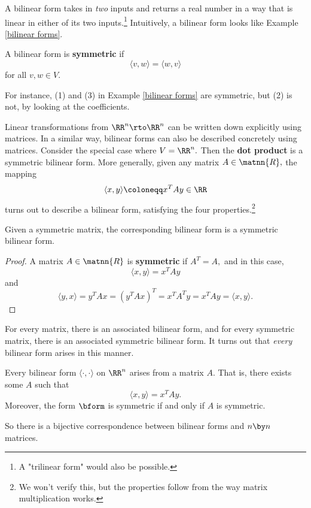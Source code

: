 A bilinear form takes in \emph{two} inputs and returns a real number in a way that is linear in either of its two inputs.\footnote{A "trilinear form" would also be possible.} Intuitively, a bilinear form looks like Example \ref{bilinear forms}.

\begin{definition}
A bilinear form is \textbf{symmetric} if \[\langle v, w \rangle = \langle w, v\rangle\] for all $v, w \in V.$
\end{definition}

For instance, (1) and (3) in Example \ref{bilinear forms} are symmetric, but (2) is not, by looking at the coefficients.

Linear transformations from $\RR^n \rto \RR^n$ can be written down explicitly using matrices. In a similar way, bilinear forms can also be described concretely using matrices. Consider the special case where $V = \RR^n.$ Then the \textbf{dot product} is a symmetric bilinear form. More generally, given any matrix $A \in \matnn{R},$ the mapping \[\langle x, y \rangle \coloneqq x^T A y \in \RR\] turns out to describe a bilinear form, satisfying the four properties.\footnote{We won't verify this, but the properties follow from the way matrix multiplication works.}

\begin{proposition}
Given a symmetric matrix, the corresponding bilinear form is a symmetric bilinear form.
\end{proposition}
\begin{proof}
A matrix $A \in \matnn{R}$ is \textbf{symmetric} if $A^T = A,$ and in this case, \[\langle x, y \rangle = x^TAy\] and \[\langle y, x \rangle = y^TAx = (y^TAx)^T = x^TA^Ty = x^TAy= \langle x, y \rangle.\]
\end{proof}

For every matrix, there is an associated bilinear form, and for every symmetric matrix, there is an associated symmetric bilinear form. It turns out that \emph{every} bilinear form arises in this manner.

\begin{proposition}\label{bilinear form comes from matrix}
Every bilinear form $\langle \cdot, \cdot \rangle$ on $\RR^n$ arises from a matrix $A.$ That is, there exists some $A$ such that \[\langle x, y \rangle = x^{T} Ay.\] Moreover, the form $\bform $ is symmetric if and only if $A$ is symmetric. 
\end{proposition}

So there is a bijective correspondence between bilinear forms and $n \by n$ matrices. 

